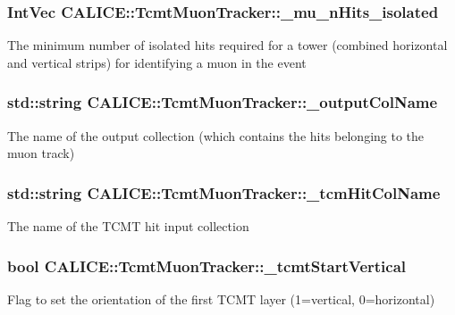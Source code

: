 \subsubsection[{\-\_\-mu\-\_\-n\-Hits\-\_\-isolated}]{\setlength{\rightskip}{0pt plus 5cm}Int\-Vec C\-A\-L\-I\-C\-E\-::\-Tcmt\-Muon\-Tracker\-::\-\_\-mu\-\_\-n\-Hits\-\_\-isolated\hspace{0.3cm}{\ttfamily [protected]}}\label{classCALICE_1_1TcmtMuonTracker_afffea757fd234d2d55bb2c1cf23ae53b}
The minimum number of isolated hits required for a tower (combined horizontal and vertical strips) for identifying a muon in the event 
\subsubsection[{\-\_\-output\-Col\-Name}]{\setlength{\rightskip}{0pt plus 5cm}std\-::string C\-A\-L\-I\-C\-E\-::\-Tcmt\-Muon\-Tracker\-::\-\_\-output\-Col\-Name\hspace{0.3cm}{\ttfamily [protected]}}\label{classCALICE_1_1TcmtMuonTracker_acd5664e441ae2efdd05146f5bc084e18}
The name of the output collection (which contains the hits belonging to the muon track) 
\subsubsection[{\-\_\-tcm\-Hit\-Col\-Name}]{\setlength{\rightskip}{0pt plus 5cm}std\-::string C\-A\-L\-I\-C\-E\-::\-Tcmt\-Muon\-Tracker\-::\-\_\-tcm\-Hit\-Col\-Name\hspace{0.3cm}{\ttfamily [protected]}}\label{classCALICE_1_1TcmtMuonTracker_a38b35b31703cb74d4a43a10eb80324cc}
The name of the T\-C\-M\-T hit input collection 
\subsubsection[{\-\_\-tcmt\-Start\-Vertical}]{\setlength{\rightskip}{0pt plus 5cm}bool C\-A\-L\-I\-C\-E\-::\-Tcmt\-Muon\-Tracker\-::\-\_\-tcmt\-Start\-Vertical\hspace{0.3cm}{\ttfamily [protected]}}\label{classCALICE_1_1TcmtMuonTracker_aaf9afbe718fe44833b890a1e522c3b87}
Flag to set the orientation of the first T\-C\-M\-T layer (1=vertical, 0=horizontal) 


